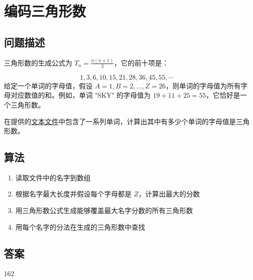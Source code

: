 \section{编码三角形数}
\subsection{问题描述}
\begin{tcolorbox}
	三角形数的生成公式为 $T_n = \frac{n(n+1)}{2}$，它的前十项是：

	\begin{equation*}
		1 , 3 , 6 , 10 , 15 , 21 , 28 , 36 , 45 , 55 , \cdots
	\end{equation*}
	给定一个单词的字母值，假设 $A=1, B=2, ..., Z=26$，则单词的字母值为所有字母对应数值的和。例如，单词 "SKY" 的字母值为
	$19 + 11 + 25 = 55$，它恰好是一个三角形数。

	在提供的\href{https://projecteuler.net/resources/documents/0042_words.txt}{文本文件}中包含了一系列单词，计算出其中有多少个单词的字母值是三角形数。
\end{tcolorbox}
\subsection{算法}
\begin{enumerate}
	\item 读取文件中的名字到数组
	\item 根据名字最大长度并假设每个字母都是 $Z$，计算出最大的分数
	\item 用三角形数公式生成能够覆盖最大名字分数的所有三角形数
	\item 用每个名字的分法在生成的三角形数中查找
\end{enumerate}

\subsection{答案}
162
